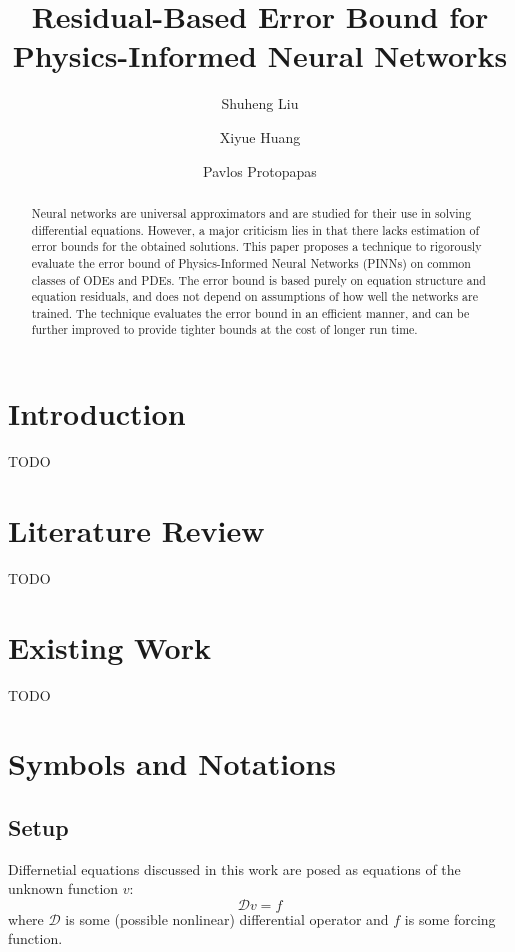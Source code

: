 \documentclass[accepted]{uai2023}
\title{Residual-Based Error Bound for Physics-Informed Neural Networks}
\author[1]{Shuheng Liu}
\author[2]{Xiyue Huang}
\author[3]{Pavlos Protopapas}
\affil[1, 3]{
    Intitute for Applied Computational Science\\
    Harvard University\\
    Cambridge, Massachusetts, USA
}
\affil[2]{
    Carnegie Mellon University \\
    Pittsburgh, Pennsylvania, USA
}
\begin{document}
\maketitle

\begin{abstract}
    Neural networks are universal approximators and are studied for their use in solving differential equations.
    However, a major criticism lies in that there lacks estimation of error bounds for the obtained solutions.
    This paper proposes a technique to rigorously evaluate the error bound of Physics-Informed Neural Networks (PINNs) on common classes of ODEs and PDEs.
    The error bound is based purely on equation structure and equation residuals, and does not depend on assumptions of how well the networks are trained.
    The technique evaluates the error bound in an efficient manner, and can be further improved to provide tighter bounds at the cost of longer run time.
\end{abstract}

\section{Introduction}
    TODO

\section{Literature Review}
    TODO

\section{Existing Work}
    TODO
\section{Symbols and Notations}

\subsection{Setup}
    Differnetial equations discussed in this work are posed as equations of the unknown function $v$:
    {
        \small
        \begin{equation*}
            \mathcal{D} v = f
        \end{equation*}
    }
    where $\mathcal{D}$ is some (possible nonlinear) differential operator and $f$ is some forcing function.
\end{document}
